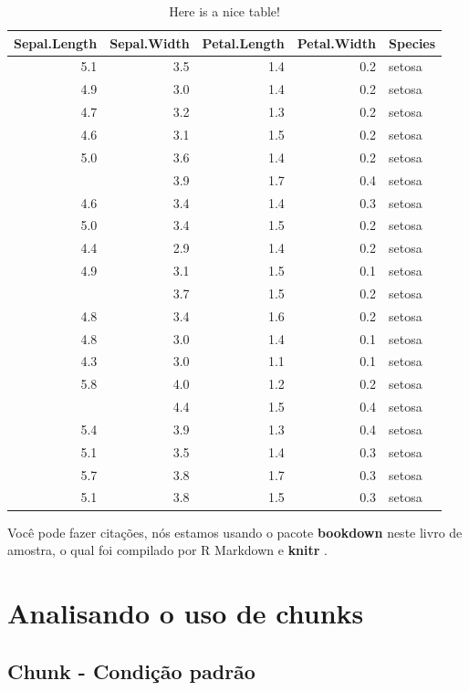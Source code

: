 \documentclass[]{book}
\begin{document}
\begin{table}

\caption{\label{tab:nice-tab}Here is a nice table!}
\centering
\begin{tabular}[t]{rrrrl}
\toprule
Sepal.Length & Sepal.Width & Petal.Length & Petal.Width & Species\\
\midrule
5.1 & 3.5 & 1.4 & 0.2 & setosa\\
4.9 & 3.0 & 1.4 & 0.2 & setosa\\
4.7 & 3.2 & 1.3 & 0.2 & setosa\\
4.6 & 3.1 & 1.5 & 0.2 & setosa\\
5.0 & 3.6 & 1.4 & 0.2 & setosa\\
\addlinespace
5.4 & 3.9 & 1.7 & 0.4 & setosa\\
4.6 & 3.4 & 1.4 & 0.3 & setosa\\
5.0 & 3.4 & 1.5 & 0.2 & setosa\\
4.4 & 2.9 & 1.4 & 0.2 & setosa\\
4.9 & 3.1 & 1.5 & 0.1 & setosa\\
\addlinespace
5.4 & 3.7 & 1.5 & 0.2 & setosa\\
4.8 & 3.4 & 1.6 & 0.2 & setosa\\
4.8 & 3.0 & 1.4 & 0.1 & setosa\\
4.3 & 3.0 & 1.1 & 0.1 & setosa\\
5.8 & 4.0 & 1.2 & 0.2 & setosa\\
\addlinespace
5.7 & 4.4 & 1.5 & 0.4 & setosa\\
5.4 & 3.9 & 1.3 & 0.4 & setosa\\
5.1 & 3.5 & 1.4 & 0.3 & setosa\\
5.7 & 3.8 & 1.7 & 0.3 & setosa\\
5.1 & 3.8 & 1.5 & 0.3 & setosa\\
\bottomrule
\end{tabular}
\end{table}

Você pode fazer citações, nós estamos usando o pacote \textbf{bookdown}
\citep{R-bookdown} neste livro de amostra, o qual foi compilado por R
Markdown e \textbf{knitr} \citep{xie2015}.

\section{Analisando o uso de chunks}\label{analisando-o-uso-de-chunks}

\subsection{Chunk - Condição
padrão}\label{chunk---condiuxe7uxe3o-padruxe3o}
\end{document}

